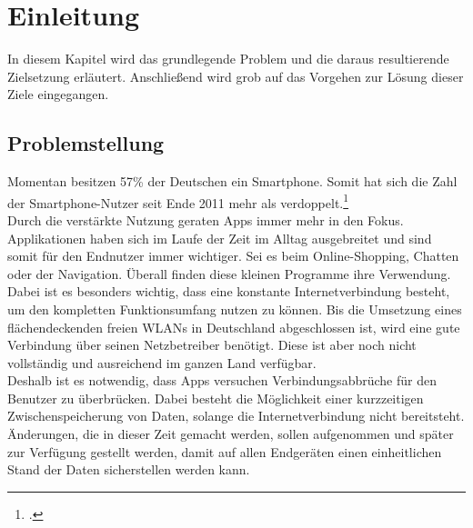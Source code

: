 \chapter{Einleitung}
\label{cha:einleitung}
In diesem Kapitel wird das grundlegende Problem und die daraus resultierende Zielsetzung erläutert. Anschließend wird grob auf das Vorgehen zur Lösung dieser Ziele eingegangen.

\section{Problemstellung}
\label{sec:problemstellung}
Momentan besitzen 57\% der Deutschen ein Smartphone. Somit hat sich die Zahl der Smartphone-Nutzer seit Ende 2011 mehr als verdoppelt.\footcite{Statista-SmartphoneNutzung}\\
Durch die verstärkte Nutzung geraten \glspl{App} immer mehr in den Fokus. Applikationen haben sich im Laufe der Zeit im Alltag ausgebreitet und sind somit für den Endnutzer immer wichtiger. Sei es beim Online-Shopping, Chatten oder der Navigation. Überall finden diese kleinen Programme ihre Verwendung.\\
Dabei ist es besonders wichtig, dass eine konstante Internetverbindung besteht, um den kompletten Funktionsumfang nutzen zu können. Bis die Umsetzung eines flächendeckenden freien \ac{WLAN}s in Deutschland abgeschlossen ist, wird eine gute Verbindung über seinen Netzbetreiber benötigt. Diese ist aber noch nicht vollständig und ausreichend im ganzen Land verfügbar.\\
Deshalb ist es notwendig, dass \glspl{App} versuchen Verbindungsabbrüche für den Benutzer zu überbrücken. Dabei besteht die Möglichkeit einer kurzzeitigen Zwischenspeicherung von Daten, solange die Internetverbindung nicht bereitsteht. Änderungen, die in dieser Zeit gemacht werden, sollen aufgenommen und später zur Verfügung gestellt werden, damit auf allen Endgeräten einen einheitlichen Stand der Daten sicherstellen werden kann.
